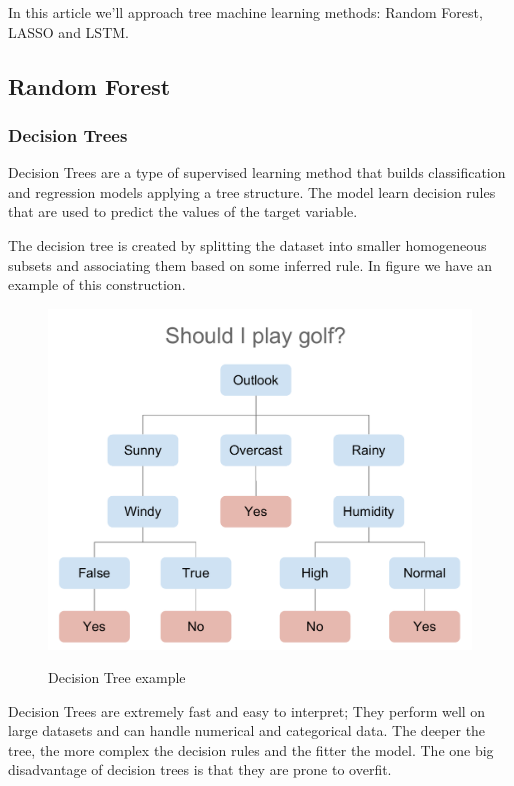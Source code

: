 \documentclass[12pt]{report}
\begin{document}

In this article we'll approach tree machine learning methods: Random Forest, LASSO and LSTM.

\subsection{Random Forest}

\subsubsection{Decision Trees}

Decision Trees are a type of supervised learning method that builds classification and regression models applying a tree structure. The model learn decision rules that are used to predict the values of the target variable.

The decision tree is created by splitting the dataset into smaller homogeneous subsets and associating them based on some inferred rule. In figure we have an example of this construction.

\begin{figure}
\centering
\includegraphics[width=\textwidth/2]{decision_tree.pdf}
\label{fig:decision_tree}
\caption{Decision Tree example}
\end{figure}

Decision Trees are extremely fast and easy to interpret; They perform well on large datasets and can handle numerical and categorical data. The deeper the tree, the more complex the decision rules and the fitter the model. The one big disadvantage of decision trees is that they are prone to overfit.
\end{document}
